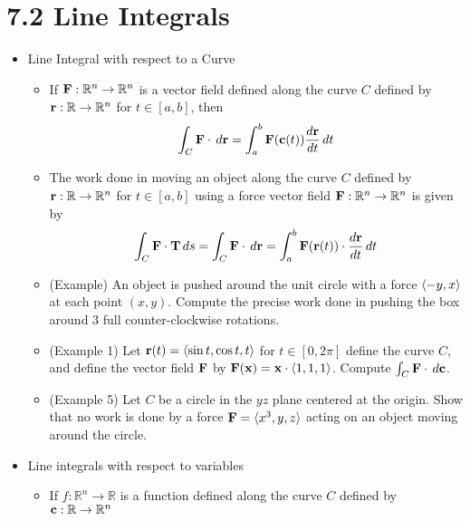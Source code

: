 \documentclass[11pt]{article}
\begin{document}
\section*{7.2 Line Integrals}

\begin{itemize}
  \item Line Integral with respect to a Curve
    \begin{itemize}
      \item If \(\mathbf{F}:\mathbb R^n\to\mathbb R^n\) is a vector field defined
            along the curve \(C\) defined by \(\mathbf{r}:\mathbb R\to\mathbb R^n\)
            for \(t\in[a,b]\), then
            \[
              \int_C \mathbf{F}\cdot\,d\mathbf{r}
                =
              \int_a^b \mathbf{F}(\mathbf{c}(t))\frac{d\mathbf{r}}{dt}\,d t
            \]
      \item The work done in moving an object along the curve \(C\) defined
            by \(\mathbf{r}:\mathbb R\to\mathbb R^n\) for \(t\in[a,b]\)
            using a force vector
            field \(\mathbf{F}:\mathbb R^n\to\mathbb R^n\) is given by
            \[
              \int_C \mathbf{F}\cdot\mathbf{T}\,d s
                =
              \int_C \mathbf{F}\cdot\,d \mathbf{r}
                =
              \int_a^b \mathbf{F}(\mathbf{r}(t))\cdot\frac{d\mathbf{r}}{dt}\,d t
            \]
      \item (Example) An object is pushed around the unit circle with
            a force \(\langle-y,x\rangle\) at each point \((x,y)\). Compute the precise
            work done in pushing the box around \(3\) full counter-clockwise
            rotations.
      \item (Example 1) Let \(\mathbf{r}(t)=\langle\sin t,\cos t,t\rangle\) for \(t\in[0,2\pi]\)
            define the curve \(C\), and define the vector field \(\mathbf{F}\)
            by \(\mathbf{F}(\mathbf{x})=\mathbf{x}\cdot\langle1,1,1\rangle\). Compute
            \(\int_C\mathbf{F}\cdot\,d\mathbf{c}\).
      \item (Example 5) Let \(C\) be a circle in the \(yz\) plane centered
            at the origin.
            Show that no work is done by a force \(\mathbf{F}=\langle x^3,y,z\rangle\)
            acting on an object moving around the circle.
    \end{itemize}
  \item Line integrals with respect to variables
    \begin{itemize}
      \item If \(f:\mathbb R^n\to\mathbb R\) is a function defined
            along the curve \(C\) defined by \(\mathbf{c}:\mathbb R\to\mathbb R^n\)

\end{itemize}
\end{itemize}
\end{document}
